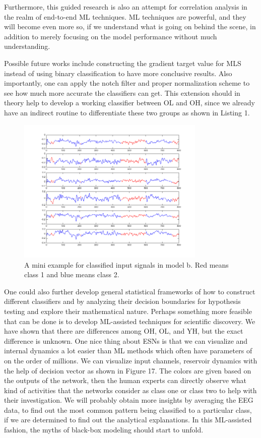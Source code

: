 \documentclass[a4paper,11pt,oneside]{article}
\begin{document}
Furthermore, this guided research is also an attempt for correlation analysis in the realm of end-to-end ML techniques. ML techniques are powerful, and they will become even more so, if we understand what is going on behind the scene, in addition to merely focusing on the model performance without much understanding. 

Possible future works include constructing the gradient target value for MLS instead of using binary classification to have more conclusive results. Also importantly, one can apply the notch filter and proper normalization scheme to see how much more accurate the classifiers can get. This extension should in theory help to develop a working classifier between OL and OH, since we already have an indirect routine to differentiate these two groups as shown in Listing 1. 

\begin{figure}[h!]
	\centering
	\includegraphics[width=0.8\textwidth]{img/futureVisu}
	\caption{A mini example for classified input signals in model b. Red means class 1 and blue means class 2.  }
\end{figure}
One could also further develop general statistical frameworks of how to construct different classifiers and by analyzing their decision boundaries for hypothesis testing and explore their mathematical nature. Perhaps something more feasible that can be done is to develop ML-assisted techniques for scientific discovery. We have shown that there are differences among OH, OL, and YH, but the exact difference is unknown. One nice thing about ESNs is that we can visualize and internal dynamics a lot easier than ML methods which often have parameters of on the order of millions. We can visualize input channels, reservoir dynamics with the help of decision vector as shown in Figure 17. The colors are given based on the outputs of the network, then the human experts can directly observe what kind of activities that the networks consider as class one or class two to help with their investigation. We will probably obtain more insights by averaging the EEG data, to find out the most common pattern being classified to a particular class, if we are determined to find out the analytical explanations. In this ML-assisted fashion, the myths of black-box modeling should start to unfold.
\end{document}
